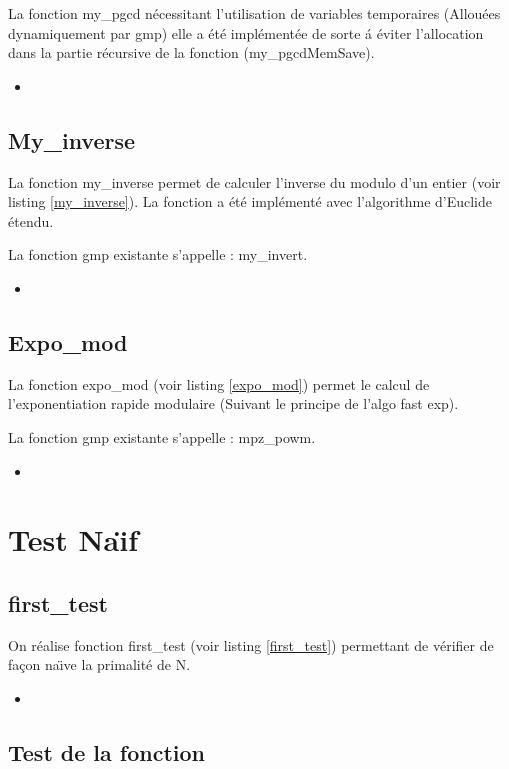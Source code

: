 \documentclass{article}
\newcommand{\cscript}[2]{
\begin{itemize}
\item[]
\end{itemize}
}
\begin{document}
La fonction my\_pgcd n\'ecessitant l'utilisation de variables temporaires (Allou\'ees dynamiquement par gmp) elle a \'et\'e impl\'ement\'ee de sorte \'a \'eviter l'allocation dans la partie r\'ecursive de la fonction (my\_pgcdMemSave).

\cscript{my_pgcd}{My\_pgcd avec gmp}

\subsection{My\_inverse}

La fonction my\_inverse permet de calculer l'inverse du modulo d'un entier (voir listing \ref{my_inverse}). La fonction a \'et\'e impl\'ement\'e avec l'algorithme d'Euclide \'etendu.

La fonction gmp existante s'appelle :  my\_invert.

\cscript{my_inverse}{my\_inverse avec gmp}

\subsection{Expo\_mod}

La fonction expo\_mod (voir listing \ref{expo_mod}) permet le calcul de l’exponentiation rapide modulaire (Suivant le principe de l'algo fast exp).

La fonction gmp existante s'appelle :  mpz\_powm.

\cscript{expo_mod}{expo\_mod avec gmp}

\newpage
\section{Test Na\"\i f}
\subsection{first\_test}
On r\'ealise fonction first\_test (voir listing \ref{first_test}) permettant de v\'erifier de façon na\"\i ve la primalit\'e de N.

\cscript{first_test}{first\_test}

\subsection{Test de la fonction}
\end{document}
